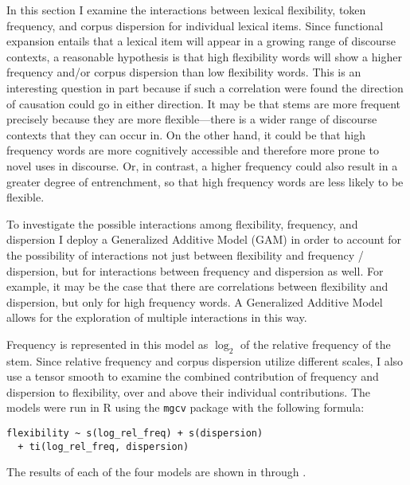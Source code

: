 In this section I examine the interactions between lexical flexibility, token frequency, and corpus dispersion for individual lexical items. Since functional expansion entails that a lexical item will appear in a growing range of discourse contexts, a reasonable hypothesis is that high flexibility words will show a higher frequency and/or corpus dispersion than low flexibility words. This is an interesting question in part because if such a correlation were found the direction of causation could go in either direction. It may be that stems are more frequent precisely because they are more flexible—there is a wider range of discourse contexts that they can occur in. On the other hand, it could be that high frequency words are more cognitively accessible and therefore more prone to novel uses in discourse. Or, in contrast, a higher frequency could also result in a greater degree of entrenchment, so that high frequency words are less likely to be flexible.

To investigate the possible interactions among flexibility, frequency, and dispersion I deploy a Generalized Additive Model (GAM) in order to account for the possibility of interactions not just between flexibility and frequency / dispersion, but for interactions between frequency and dispersion as well. For example, it may be the case that there are correlations between flexibility and dispersion, but only for high frequency words. A Generalized Additive Model allows for the exploration of multiple interactions in this way.

Frequency is represented in this model as $\log_2$ of the relative frequency of the stem. Since relative frequency and corpus dispersion utilize different scales, I also use a tensor smooth to examine the combined contribution of frequency and dispersion to flexibility, over and above their individual contributions. The models were run in R using the \texttt{mgcv} package with the following formula:

\begin{verbatim}
flexibility ~ s(log_rel_freq) + s(dispersion)
  + ti(log_rel_freq, dispersion)
\end{verbatim}

The results of each of the four models are shown in  through .

